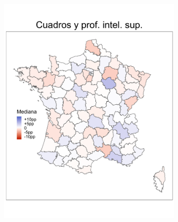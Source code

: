 \begin{figure}
\begin{subfigure}{0.235\textwidth}
	\includegraphics[width = \textwidth]{Figs/Efectos/Mapa_Efectos_CSP3_Modelo_H}
	\end{subfigure}
	~
	\begin{subfigure}{0.235\textwidth}

\end{subfigure}
\end{figure}
